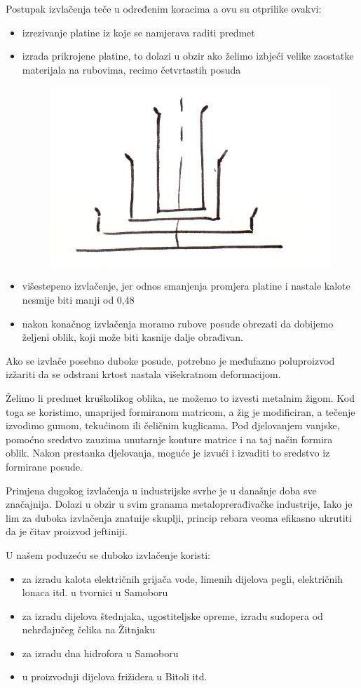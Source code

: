 \documentclass[a4paper,12pt]{article}
\numberwithin{figure}{section}
\begin{document}
Postupak izvlačenja teče u određenim koracima a ovu su otprilike ovakvi:
\begin{itemize}
\item izrezivanje platine iz koje se namjerava raditi predmet
\item izrada prikrojene platine, to dolazi u obzir ako želimo izbjeći velike zaostatke materijala na rubovima, recimo četvrtastih posuda
\begin{figure}[!h]
\centering
\includegraphics[scale=0.15]{image_45-2.png}
\end{figure}
\FloatBarrier
\item višestepeno izvlačenje, jer odnos smanjenja promjera platine i nastale kalote nesmije biti manji od 0,48
\item nakon konačnog izvlačenja moramo rubove posude obrezati da dobijemo željeni oblik, koji može biti kasnije dalje obrađivan.
\end{itemize}
Ako se izvlače posebno duboke posude, potrebno je međufazno poluproizvod izžariti da se odstrani krtost nastala višekratnom deformacijom.\par
Želimo li predmet kruškolikog oblika, ne možemo to izvesti metalnim žigom. Kod toga se koristimo, unaprijed formiranom matricom, a žig je modificiran, a tečenje izvodimo gumom, tekućinom ili čeličnim kuglicama. Pod djelovanjem vanjske, pomoćno sredstvo zauzima unutarnje konture matrice i na taj način formira oblik. Nakon prestanka djelovanja, moguće je izvući i izvaditi to sredstvo iz formirane posude. \par
Primjena dugokog izvlačenja u industrijske svrhe je u današnje doba sve značajnija. Dolazi u obzir u svim granama metaloprerađivačke industrije, Iako je lim za duboka izvlačenja znatnije skuplji, princip rebara veoma efikasno ukrutiti da je čitav proizvod jeftiniji.\par
U našem poduzeću se duboko izvlačenje koristi:
\begin{itemize}
\item za izradu kalota električnih grijača vode, limenih dijelova pegli, električnih lonaca itd. u tvornici u Samoboru
\item za izradu dijelova štednjaka, ugostiteljske opreme, izradu sudopera od nehrđajučeg čelika na Žitnjaku
\item za izradu dna hidrofora u Samoboru
\item u proizvodnji dijelova frižidera u Bitoli itd.
\end{itemize}
\clearpage
\end{document}
